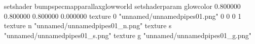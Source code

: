 setshader bumpspecmapparallaxglowworld
setshaderparam glowcolor 0.800000 0.800000 0.800000 0.000000
texture 0 "unnamed/unnamedpipes01.png" 0 0 0 1
texture n "unnamed/unnamedpipes01_n.png"
texture s "unnamed/unnamedpipes01_s.png"
texture g "unnamed/unnamedpipes01_g.png"
